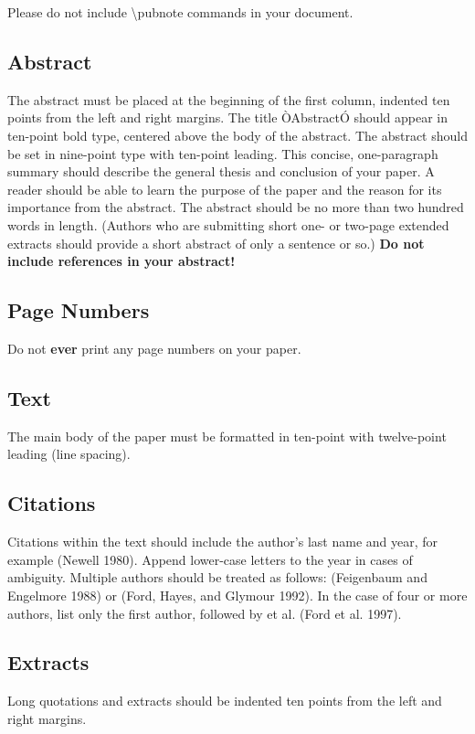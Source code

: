 \documentclass[letterpaper]{article}
\begin{document}
	Please do not include \textbackslash pubnote commands in your document.
	
	\subsection{Abstract}
	The abstract must be placed at the beginning of the first column, indented ten points from the left and right margins. The title ÒAbstractÓ should appear in ten-point bold type, centered above the body of the abstract. The abstract should be set in nine-point type with ten-point leading. This concise, one-paragraph summary should describe the general thesis and conclusion of your paper. A reader should be able to learn the purpose of the paper and the reason for its importance from the abstract. The abstract should be no more than two hundred words in length. (Authors who are submitting short one- or two-page extended extracts should provide a short abstract of only a sentence or so.) \textbf{Do not include references in your abstract!}
	
	\subsection{Page Numbers}
	
	Do not \textbf{ever} print any page numbers on your paper. 
	
	\subsection{Text }
	The main body of the paper must be formatted in ten-point with twelve-point leading (line spacing).
	
	\subsection{Citations}
	Citations within the text should include the author's last name and year, for example (Newell 1980). Append lower-case letters to the year in cases of ambiguity. Multiple authors should be treated as follows: (Feigenbaum and Engelmore 1988) or (Ford, Hayes, and Glymour 1992). In the case of four or more authors, list only the first author, followed by et al. (Ford et al. 1997).
	
	\subsection{Extracts}
	Long quotations and extracts should be indented ten points from the left and right margins. 
	
\end{document}
